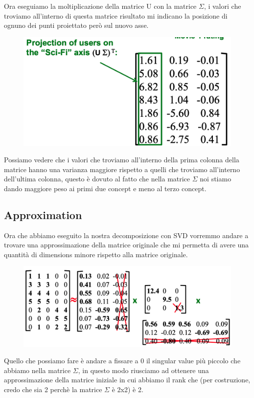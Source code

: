 \documentclass[14pt]{extreport}
\begin{document}
Ora eseguiamo la moltiplicazione della matrice U con la matrice $\Sigma$, i valori che troviamo all'interno di questa matrice risultato mi indicano la
posizione di ognuno dei punti proiettato però sul nuovo asse.


\begin{figure}[H]
	\centering
	\includegraphics[width=0.7\linewidth]{505.jpeg}
\end{figure}


Possiamo vedere che i valori che troviamo all'interno della prima colonna della matrice hanno una varianza maggiore rispetto a quelli che troviamo
all'interno dell'ultima colonna, questo è dovuto al fatto che nella matrice $\Sigma$ noi stiamo dando maggiore peso ai primi due concept e meno al
terzo concept.

\subsection{Approximation}

Ora che abbiamo eseguito la nostra decomposizione con SVD vorremmo andare a trovare una approssimazione della matrice originale che mi permetta di
avere una quantità di dimensions minore rispetto alla matrice originale.

\begin{figure}[H]
	\centering
	\includegraphics[width=0.7\linewidth]{506.jpeg}
\end{figure}

Quello che possiamo fare è andare a fissare a 0 il singular value più piccolo che abbiamo nella matrice $\Sigma$, in questo modo riusciamo ad ottenere
una approssimazione della matrice iniziale in cui abbiamo il rank che (per costruzione, credo che sia 2 perchè la matrice $\Sigma$ è 2x2) è 2.
\end{document}
